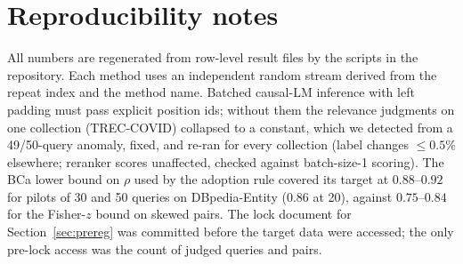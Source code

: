 \documentclass{article}
\begin{document}
\section{Reproducibility notes}\label{app:repro}
All numbers are regenerated from row-level result files by the scripts in the repository. Each method uses an independent random stream derived from the repeat index and the method name. Batched causal-LM inference with left padding must pass explicit position ids; without them the relevance judgments on one collection (TREC-COVID) collapsed to a constant, which we detected from a 49/50-query anomaly, fixed, and re-ran for every collection (label changes $\le0.5\%$ elsewhere; reranker scores unaffected, checked against batch-size-1 scoring). The BCa lower bound on $\rho$ used by the adoption rule covered its target at $0.88$--$0.92$ for pilots of 30 and 50 queries on DBpedia-Entity ($0.86$ at 20), against $0.75$--$0.84$ for the Fisher-$z$ bound on skewed pairs. The lock document for Section~\ref{sec:prereg} was committed before the target data were accessed; the only pre-lock access was the count of judged queries and pairs.
\end{document}
